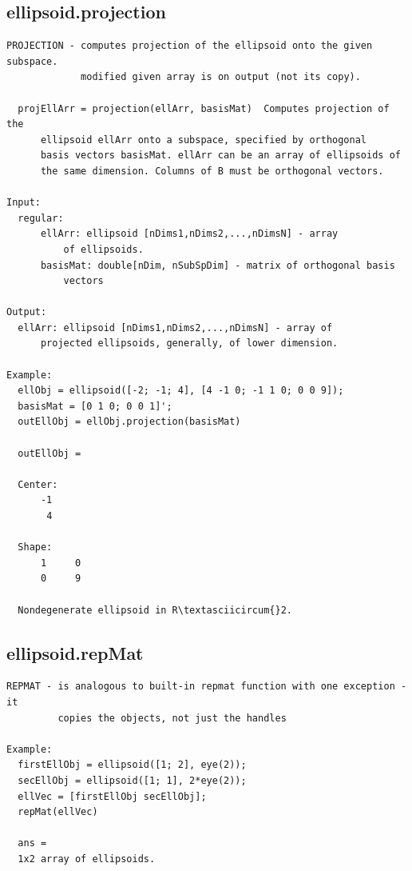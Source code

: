 \documentclass[letterpaper,10pt,english]{sphinxmanual}
\begin{document}
\subsection{ellipsoid.projection}
\label{chap_functions:ellipsoid-projection}
\begin{Verbatim}[commandchars=\\\{\}]
PROJECTION - computes projection of the ellipsoid onto the given subspace.
             modified given array is on output (not its copy).

  projEllArr = projection(ellArr, basisMat)  Computes projection of the
      ellipsoid ellArr onto a subspace, specified by orthogonal
      basis vectors basisMat. ellArr can be an array of ellipsoids of
      the same dimension. Columns of B must be orthogonal vectors.

Input:
  regular:
      ellArr: ellipsoid [nDims1,nDims2,...,nDimsN] - array
          of ellipsoids.
      basisMat: double[nDim, nSubSpDim] - matrix of orthogonal basis
          vectors

Output:
  ellArr: ellipsoid [nDims1,nDims2,...,nDimsN] - array of
      projected ellipsoids, generally, of lower dimension.

Example:
  ellObj = ellipsoid([-2; -1; 4], [4 -1 0; -1 1 0; 0 0 9]);
  basisMat = [0 1 0; 0 0 1]';
  outEllObj = ellObj.projection(basisMat)

  outEllObj =

  Center:
      -1
       4

  Shape:
      1     0
      0     9

  Nondegenerate ellipsoid in R\textasciicircum{}2.
\end{Verbatim}


\subsection{ellipsoid.repMat}
\label{chap_functions:ellipsoid-repmat}
\begin{Verbatim}[commandchars=\\\{\}]
REPMAT - is analogous to built-in repmat function with one exception - it
         copies the objects, not just the handles

Example:
  firstEllObj = ellipsoid([1; 2], eye(2));
  secEllObj = ellipsoid([1; 1], 2*eye(2));
  ellVec = [firstEllObj secEllObj];
  repMat(ellVec)

  ans =
  1x2 array of ellipsoids.
\end{Verbatim}
\end{document}
